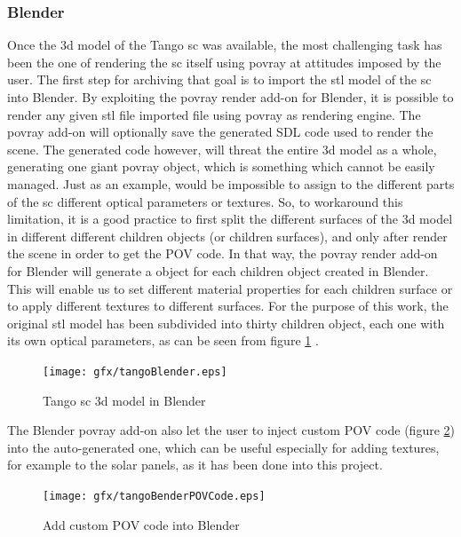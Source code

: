 \subsubsection{Blender}
Once the \acrshort{3d} model of the Tango \acrshort{sc} was available, the most challenging task has been the one of rendering the \acrshort{sc} itself using \acrshort{povray} at attitudes imposed by the user.
The first step for archiving that goal is to import the \acrshort{stl} model of the \acrshort{sc} into Blender. By exploiting the \acrshort{povray} render add-on for Blender, it is possible to render any given \acrshort{stl} file imported file using \acrshort{povray} as rendering engine. The \acrshort{povray} add-on will optionally save the generated SDL code used to render the scene.
The generated code however, will threat the entire \acrshort{3d} model as a whole, generating one giant \acrshort{povray}  object, which is something which cannot be easily managed. Just as an example, would be impossible to assign to the different parts of the \acrshort{sc} different optical parameters or textures.
So, to workaround this limitation, it is a good practice to first split the different surfaces of the \acrshort{3d} model in different different children objects (or children surfaces), and only after render the scene in order to get the POV code. In that way, the \acrshort{povray} render add-on for Blender will generate a  object for each children object created in Blender.
This will enable us to set different material properties for each children surface or to apply different textures to different surfaces.
For the purpose of this work, the original \acrshort{stl} model has been subdivided into thirty children object, each one with its own optical parameters, as can be seen from figure \ref{fig:tangoblender} .

\begin{figure}
  \centering
  \texttt{[image: gfx/tangoBlender.eps]}
  \caption{Tango \acrshort{sc} \acrshort{3d} model in Blender}
  \label{fig:tangoblender}
\end{figure}

The Blender \acrshort{povray} add-on also let the user to inject custom POV code (figure \ref{fig:tangoblenderpov}) into the auto-generated one, which can be useful especially for adding textures, for example to the solar panels, as it has been done into this project.

\begin{figure}
  \centering
  \texttt{[image: gfx/tangoBenderPOVCode.eps]}
  \caption{Add custom POV code into Blender}
  \label{fig:tangoblenderpov}
\end{figure}

